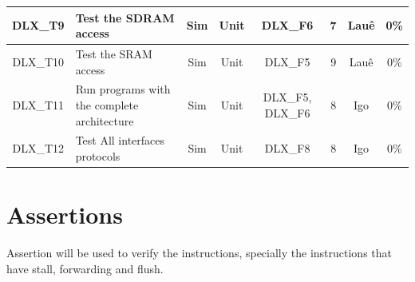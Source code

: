 \documentclass{article}
\begin{document}
\begin{landscape}
\begin{center}
\begin{longtable}[pos]{| c | m{5cm} | c | c | c | c | c | c |}
		DLX\_T9      & Test the SDRAM access  &	Sim & Unit & DLX\_F6 & 7 & Lauê & 0\% \\ \hline        
		DLX\_T10      & Test the SRAM access  &	Sim & Unit & DLX\_F5 & 9 & Lauê & 0\% \\ \hline        
		DLX\_T11      & Run programs with the complete architecture  &	Sim & Unit & DLX\_F5, DLX\_F6 & 8 & Igo & 0\% \\ \hline        
		DLX\_T12      & Test All interfaces protocols  &	Sim & Unit & DLX\_F8 & 8 & Igo & 0\% \\ \hline        

      \end{longtable}
    \end{center}		
  \end{landscape}
  
  \newpage
	\section{Assertions}
	Assertion will be used to verify the instructions, specially the instructions that have stall, forwarding and flush.
  \FloatBarrier
\end{document}
